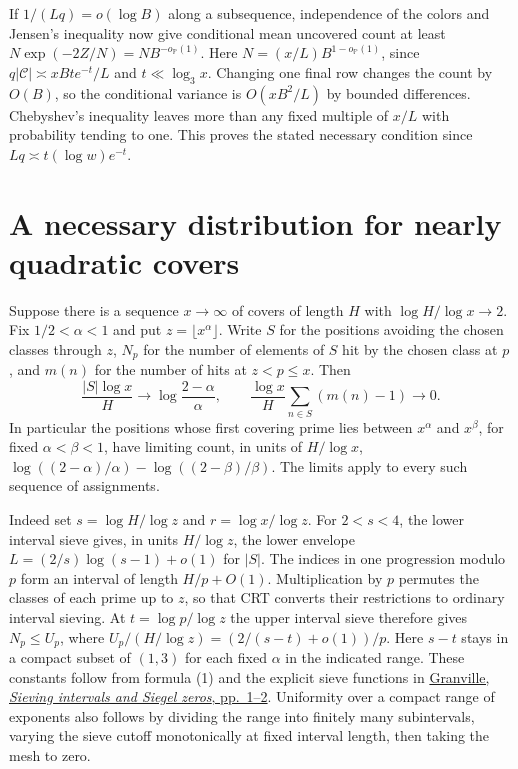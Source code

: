 \documentclass[11pt]{article}
\begin{document}
If $1/(Lq)=o(\log B)$ along a subsequence, independence of the colors
and Jensen's inequality now give conditional mean uncovered count
at least $N\exp(-2Z/N)=N B^{-o_{\mathbb P}(1)}$.
Here $N=(x/L)B^{1-o_{\mathbb P}(1)}$, since
$q|\mathcal C|\asymp xBt e^{-t}/L$ and $t\ll\log_3 x$.
Changing one final row changes the count by $O(B)$, so the
conditional variance is $O(xB^2/L)$ by bounded differences.
Chebyshev's inequality leaves more than any fixed multiple of $x/L$
with probability tending to one. This proves the stated necessary
condition since $Lq\asymp t(\log w)e^{-t}$.

\section*{A necessary distribution for nearly quadratic covers}
Suppose there is a sequence $x\to\infty$ of covers of length $H$ with
$\log H/\log x\to2$. Fix $1/2<\alpha<1$ and put $z=\lfloor x^\alpha\rfloor$.
Write $S$ for the positions avoiding the chosen classes through $z$,
$N_p$ for the number of elements of $S$ hit by the chosen class at $p$,
and $m(n)$ for the number of hits at $z<p\le x$. Then
\[
 \frac{|S|\log x}{H}\longrightarrow \log\frac{2-\alpha}{\alpha},
 \qquad
 \frac{\log x}{H}\sum_{n\in S}(m(n)-1)\longrightarrow0 .
\]
In particular the positions whose first covering prime lies between
$x^\alpha$ and $x^\beta$, for fixed $\alpha<\beta<1$, have limiting
count, in units of $H/\log x$,
$\log((2-\alpha)/\alpha)-\log((2-\beta)/\beta)$.
The limits apply to every such sequence of assignments.

Indeed set $s=\log H/\log z$ and $r=\log x/\log z$.
For $2<s<4$, the lower interval sieve gives, in units $H/\log z$,
the lower envelope $L=(2/s)\log(s-1)+o(1)$ for $|S|$.
The indices in one progression modulo $p$ form an interval of length
$H/p+O(1)$. Multiplication by $p$ permutes the classes of each
prime up to $z$, so that CRT converts their restrictions to ordinary
interval sieving. At $t=\log p/\log z$ the upper interval sieve
therefore gives $N_p\le U_p$, where
$U_p/(H/\log z)=(2/(s-t)+o(1))/p$. Here $s-t$ stays in a compact subset of
$(1,3)$ for each fixed $\alpha$ in the indicated range.
These constants follow from formula (1) and the explicit sieve
functions in \href{https://arxiv.org/pdf/2010.01211}{Granville,
\emph{Sieving intervals and Siegel zeros}, pp.\ 1--2}. Uniformity
over a compact range of exponents also follows by dividing the
range into finitely many subintervals, varying the sieve cutoff
monotonically at fixed interval length, then taking the mesh to zero.
\end{document}
